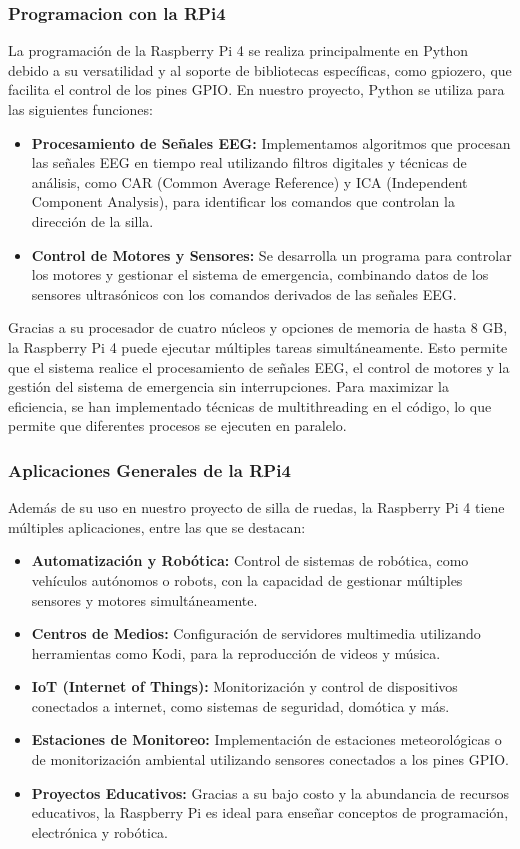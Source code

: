 \documentclass{article}
\begin{document}
\subsubsection{Programacion con la RPi4}
La programación de la Raspberry Pi 4 se realiza principalmente en Python debido a su versatilidad y al soporte de bibliotecas específicas, como gpiozero, que facilita el control de los pines GPIO. En nuestro proyecto, Python se utiliza para las siguientes funciones:
\begin{itemize}
    \item \textbf{Procesamiento de Señales EEG:} Implementamos algoritmos que procesan las señales EEG en tiempo real utilizando filtros digitales y técnicas de análisis, como CAR (Common Average Reference) y ICA (Independent Component Analysis), para identificar los comandos que controlan la dirección de la silla.
    \item \textbf{Control de Motores y Sensores:} Se desarrolla un programa para controlar los motores y gestionar el sistema de emergencia, combinando datos de los sensores ultrasónicos con los comandos derivados de las señales EEG.
\end{itemize}
Gracias a su procesador de cuatro núcleos y opciones de memoria de hasta 8 GB, la Raspberry Pi 4 puede ejecutar múltiples tareas simultáneamente. Esto permite que el sistema realice el procesamiento de señales EEG, el control de motores y la gestión del sistema de emergencia sin interrupciones. Para maximizar la eficiencia, se han implementado técnicas de multithreading en el código, lo que permite que diferentes procesos se ejecuten en paralelo.

\subsubsection{Aplicaciones Generales de la RPi4}
Además de su uso en nuestro proyecto de silla de ruedas, la Raspberry Pi 4 tiene múltiples aplicaciones, entre las que se destacan:

\begin{itemize}
    \item \textbf{Automatización y Robótica:} Control de sistemas de robótica, como vehículos autónomos o robots, con la capacidad de gestionar múltiples sensores y motores simultáneamente.
    \item \textbf{Centros de Medios:} Configuración de servidores multimedia utilizando herramientas como Kodi, para la reproducción de videos y música.
    \item \textbf{IoT (Internet of Things):} Monitorización y control de dispositivos conectados a internet, como sistemas de seguridad, domótica y más.
    \item \textbf{Estaciones de Monitoreo:} Implementación de estaciones meteorológicas o de monitorización ambiental utilizando sensores conectados a los pines GPIO.
    \item \textbf{Proyectos Educativos:} Gracias a su bajo costo y la abundancia de recursos educativos, la Raspberry Pi es ideal para enseñar conceptos de programación, electrónica y robótica.
\end{itemize}
\end{document}
